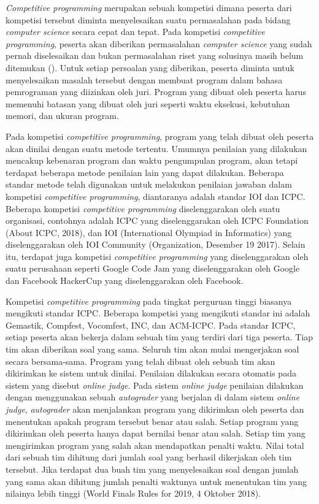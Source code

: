 \par \textit{Competitive programming} merupakan sebuah kompetisi dimana peserta dari kompetisi tersebut diminta menyelesaikan suatu permasalahan pada bidang \textit{computer science} secara cepat dan tepat. Pada kompetisi \textit{competitive programming}, peserta akan diberikan permasalahan \textit{computer science} yang sudah pernah diselesaikan dan bukan permasalahan riset yang solusinya masih belum ditemukan (\cite{halimsfcp3}). Untuk setiap persoalan yang diberikan, peserta diminta untuk menyelesaikan masalah tersebut dengan membuat program dalam bahasa pemrograman yang diizinkan oleh juri. Program yang dibuat oleh peserta harus memenuhi batasan yang dibuat oleh juri seperti waktu eksekusi, kebutuhan memori, dan ukuran program.
\par Pada kompetisi \textit{competitive programming}, program yang telah dibuat oleh peserta akan dinilai dengan suatu metode tertentu. Umumnya penilaian yang dilakukan mencakup kebenaran program dan waktu pengumpulan program, akan tetapi terdapat beberapa metode penilaian lain yang dapat dilakukan. Beberapa standar metode telah digunakan untuk melakukan penilaian jawaban dalam kompetisi \textit{competitive programming}, diantaranya adalah standar IOI dan ICPC. Beberapa kompetisi \textit{competitive programming} diselenggarakan oleh suatu organisasi, contohnya adalah ICPC yang diselenggarakan oleh ICPC Foundation (About ICPC, 2018), dan IOI (International Olympiad in Informatics) yang diselenggarakan oleh IOI Community (Organization, Desember 19 2017). Selain itu, terdapat juga kompetisi \textit{competitive programming} yang diselenggarakan oleh suatu perusahaan seperti Google Code Jam yang diselenggarakan oleh Google dan Facebook HackerCup yang diselenggarakan oleh Facebook.
\par Kompetisi \textit{competitive programming} pada tingkat perguruan tinggi biasanya mengikuti standar ICPC. Beberapa kompetisi yang mengikuti standar ini adalah Gemastik, Compfest, Vocomfest, INC, dan ACM-ICPC. Pada standar ICPC, setiap peserta akan bekerja dalam sebuah tim yang terdiri dari tiga peserta. Tiap tim akan diberikan soal yang sama. Seluruh tim akan mulai mengerjakan soal secara bersama-sama. Program yang telah dibuat oleh sebuah tim akan dikirimkan ke sistem untuk dinilai. Penilaian dilakukan secara otomatis pada sistem yang disebut \textit{online judge}. Pada sistem \textit{online judge} penilaian dilakukan dengan menggunakan sebuah \textit{autograder} yang berjalan di dalam sistem \textit{online judge}, \textit{autograder} akan menjalankan program yang dikirimkan oleh peserta dan menentukan apakah program tersebut benar atau salah. Setiap program yang dikirimkan oleh peserta hanya dapat bernilai benar atau salah. Setiap tim yang mengirimkan program yang salah akan mendapatkan penalti waktu. Nilai total dari sebuah tim dihitung dari jumlah soal yang berhasil dikerjakan oleh tim tersebut. Jika terdapat dua buah tim yang menyelesaikan soal dengan jumlah yang sama akan dihitung jumlah penalti waktunya untuk menentukan tim yang nilainya lebih tinggi (World Finals Rules for 2019, 4 Oktober 2018).
